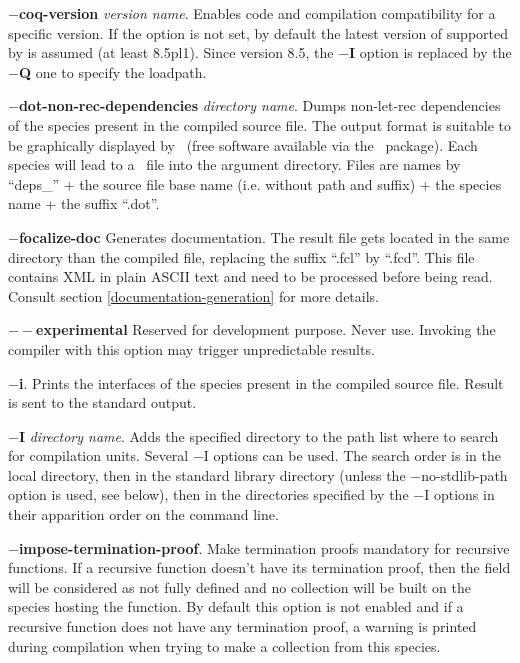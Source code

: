 \begin{compact-itemize}
  \item[*] {\bf $-$coq-version} {\em version name}.
    Enables {\coq} code and compilation compatibility for a specific version.
    If the option is not set, by default the latest version of {\coq} supported
    by {\focal} is assumed (at least 8.5pl1). Since {\coq} version 8.5, the
    {\bf $-$I} option is replaced by the {\bf $-$Q} one to specify the
    loadpath.
  \item[*] {\bf $-$dot-non-rec-dependencies} {\em directory name}.
    Dumps non-let-rec dependencies of the species present in the
    compiled source file. The output format is suitable to be
    graphically displayed by \dotty\ (free software available via the
    \graphviz\ package). Each species will lead to a \dotty\ file into
    the argument directory. Files are names by ``deps\_'' + the source
    file base name (i.e. without path and suffix) + the species name +
    the suffix ``.dot''.

  \item[*] {\bf $-$focalize-doc} Generates documentation. The
    result file gets located in the same directory than the compiled
    file, replacing the suffix ``.fcl'' by ``.fcd''. This file contains
    XML in plain ASCII text and need to be processed before being read.
    Consult section \ref{documentation-generation} for more details.

  \item[*] {\bf $--$experimental} Reserved for development purpose.
    Never use. Invoking the compiler with this option may trigger
    unpredictable results.

  \item[*] {\bf $-$i}. Prints the interfaces of the species present in
    the compiled source file. Result is sent to the standard output.

  \item[*] {\bf $-$I} {\em directory name}. Adds the specified
    directory to the path list where to search for
    compilation units. Several $-$I options can be used. The search order is
    in the local directory, then in the standard library directory (unless the
    $-$no-stdlib-path option is used, see below), then in the
    directories specified by the $-$I options in their apparition
    order on the command line.

  \item[*] {\bf $-$impose-termination-proof}. Make termination proofs
    mandatory for recursive functions. If a recursive function doesn't
    have its termination proof, then the field will be considered as
    not fully defined and no collection will be built on the
    species hosting the function. By default this option is not
    enabled and if a recursive function does not have any termination
    proof, a warning is printed during compilation when trying to make
    a collection from this species.


\end{compact-itemize}
